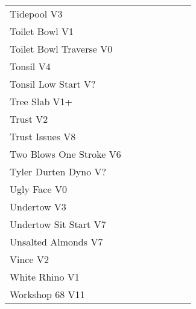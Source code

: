 \begin{flushleft}
\begin{center}
\begin{supertabular}{p{0.65\linewidth}r}
Tidepool V3 & \pageref{rt:Tidepool} \\
Toilet Bowl V1 & \pageref{rt:Toilet Bowl} \\
Toilet Bowl Traverse V0 & \pageref{rt:Toilet Bowl Traverse} \\
Tonsil V4 & \pageref{rt:Tonsil} \\
Tonsil Low Start V? & \pageref{vr:Tonsil Low Start} \\
Tree Slab V1+ & \pageref{rt:Tree Slab} \\
Trust V2 & \pageref{rt:Trust} \\
Trust Issues V8 & \pageref{rt:Trust Issues} \\
Two Blows One Stroke V6 & \pageref{rt:Two Blows One Stroke} \\
Tyler Durten Dyno V? & \pageref{vr:Tyler Durten Dyno} \\
Ugly Face V0 & \pageref{rt:Ugly Face} \\
Undertow V3 & \pageref{rt:Undertow} \\
Undertow Sit Start V7 & \pageref{vr:Undertow Sit Start} \\
Unsalted Almonds V7 & \pageref{rt:Unsalted Almonds} \\
Vince V2 & \pageref{rt:Vince} \\
White Rhino V1 & \pageref{rt:White Rhino} \\
Workshop 68 V11 & \pageref{rt:Workshop 68} \\
\end{supertabular}
\end{center}

\end{flushleft}
